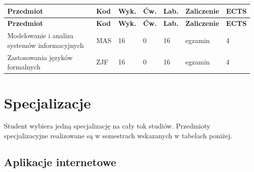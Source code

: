 \documentclass[12pt,a4paper]{article}
\newcommand{\thdrule}{\noalign{\global\setlength{\extrarowheight}{0pt}}}
\newcommand{\thdend}{\noalign{\global\setlength{\extrarowheight}{4pt}}}
\begin{document}
{\scriptsize
\begin{longtable}{m{5.5cm}m{0.8cm}m{1cm}m{1cm}m{1cm}m{1.7cm}m{0.7cm}}
\thdrule\toprule
\rowcolor{pjatkRed}
{\color{white}\footnotesize\textbf{\vphantom{Ag}Przedmiot}} & {\color{white}\footnotesize\textbf{\vphantom{Ag}Kod}} & {\color{white}\footnotesize\textbf{\vphantom{Ag}Wyk.}} & {\color{white}\footnotesize\textbf{\vphantom{Ag}Ćw.}} & {\color{white}\footnotesize\textbf{\vphantom{Ag}Lab.}} & {\color{white}\footnotesize\textbf{\vphantom{Ag}Zaliczenie}} & {\color{white}\footnotesize\textbf{\vphantom{Ag}ECTS}} \\
\midrule\thdend
\endfirsthead
\thdrule\toprule
\rowcolor{pjatkRed}
{\color{white}\footnotesize\textbf{\vphantom{Ag}Przedmiot}} & {\color{white}\footnotesize\textbf{\vphantom{Ag}Kod}} & {\color{white}\footnotesize\textbf{\vphantom{Ag}Wyk.}} & {\color{white}\footnotesize\textbf{\vphantom{Ag}Ćw.}} & {\color{white}\footnotesize\textbf{\vphantom{Ag}Lab.}} & {\color{white}\footnotesize\textbf{\vphantom{Ag}Zaliczenie}} & {\color{white}\footnotesize\textbf{\vphantom{Ag}ECTS}} \\
\midrule\thdend
\endhead
\rowcolor{tableRowLight} Modelowanie i analiza systemów informacyjnych & MAS & 16 & 0 & 16 & {\scriptsize egzamin} & 4 \\
\rowcolor{tableRowAlt} Zastosowania języków formalnych & ZJF & 16 & 0 & 16 & {\scriptsize egzamin} & 4 \\
\bottomrule
\end{longtable}}



\newpage

\section{Specjalizacje}

Student wybiera jedną specjalizację na cały tok studiów. Przedmioty specjalizacyjne realizowane są w semestrach wskazanych w tabelach poniżej.

\subsection*{Aplikacje internetowe}
\end{document}
